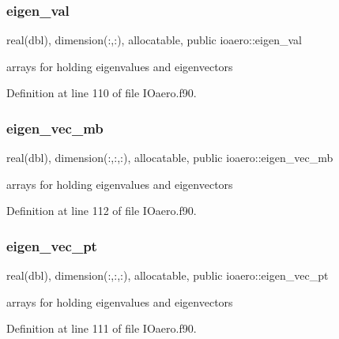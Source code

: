 \subsubsection{\texorpdfstring{eigen\+\_\+val}{eigen\_val}}
{\footnotesize\ttfamily real(dbl), dimension(\+:,\+:), allocatable, public ioaero\+::eigen\+\_\+val}



arrays for holding eigenvalues and eigenvectors 



Definition at line 110 of file I\+Oaero.\+f90.

\mbox{\label{namespaceioaero_a0d150f0b81c676515b90fcf83d7ff8c3}} 
\subsubsection{\texorpdfstring{eigen\+\_\+vec\+\_\+mb}{eigen\_vec\_mb}}
{\footnotesize\ttfamily real(dbl), dimension(\+:,\+:,\+:), allocatable, public ioaero\+::eigen\+\_\+vec\+\_\+mb}



arrays for holding eigenvalues and eigenvectors 



Definition at line 112 of file I\+Oaero.\+f90.

\mbox{\label{namespaceioaero_a53e09660909f61713dee3887a3adc1ec}} 
\subsubsection{\texorpdfstring{eigen\+\_\+vec\+\_\+pt}{eigen\_vec\_pt}}
{\footnotesize\ttfamily real(dbl), dimension(\+:,\+:,\+:), allocatable, public ioaero\+::eigen\+\_\+vec\+\_\+pt}



arrays for holding eigenvalues and eigenvectors 



Definition at line 111 of file I\+Oaero.\+f90.

\mbox{\label{namespaceioaero_a8d534ecfa53489b513fc3e339bbfc064}} 
